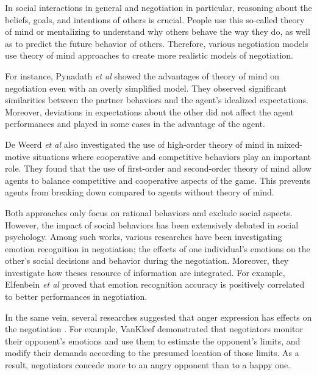 \documentclass[conference, letterpaper]{IEEEtran}
\begin{document}
	In social interactions in general and negotiation in particular, reasoning about the beliefs, goals, and intentions of others is crucial. People use this so-called theory of mind \cite{premack1978does} or mentalizing to understand why others behave the way they do, as well as to predict the future behavior of others. Therefore, various negotiation models use theory of mind approaches to create  more realistic models of negotiation. 
	
	For instance, Pynadath \textit{et al} \cite{pynadath2013you} showed the advantages of theory of mind on negotiation even with an overly simplified model. They observed significant similarities between	the partner behaviors and the agent's idealized expectations. Moreover, deviations in expectations about the other did not affect the agent performances and played in some cases in the advantage of the agent.
	
	De Weerd \textit{et al} \cite{de2013higher} also investigated the use of high-order theory of mind in mixed-motive situations where cooperative and competitive behaviors play an important role. They found that the use of first-order and second-order theory of mind allow agents to balance competitive and cooperative	aspects of the game. This prevents agents from breaking down compared to  agents without theory of mind.
	
	
	Both approaches only focus on rational behaviors and exclude social aspects. However, the impact of social behaviors has been extensively debated in social psychology. Among such works, various researches have been investigating emotion recognition in negotiation; the effects of one individual's	emotions on the other's social decisions and behavior during the negotiation. Moreover, they investigate how theses resource of information are integrated.
	For example, Elfenbein\textit{ et al} \cite{elfenbein2007reading} proved that  emotion recognition accuracy is positively correlated to  better performances in negotiation.
	
	In the same vein, several researches suggested that anger expression has effects on the negotiation \cite{sinaceur2006get,van2010interpersonal,ferguson2004social}. For example, VanKleef \cite{van2004interpersonal} demonstrated that negotiators monitor their opponent's emotions and use them to estimate the opponent's limits, and modify their demands according to the presumed location of those limits. As a result, negotiators concede more to an angry opponent than to a happy one. 
	
\end{document}
